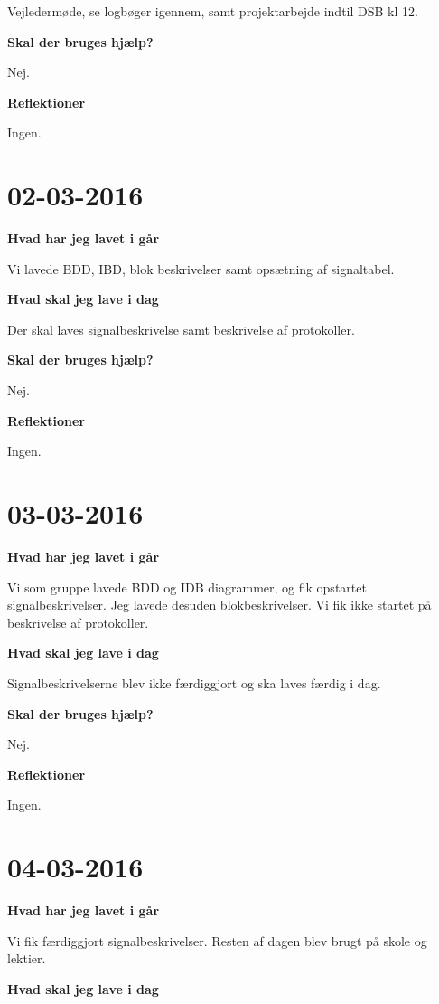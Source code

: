 \documentclass{article}
\begin{document}
	Vejledermøde, se logbøger igennem, samt projektarbejde indtil DSB kl 12.
	
	\textbf{Skal der bruges hjælp?}
	
	Nej.
	
	\textbf{Reflektioner}
	
	Ingen.
		
	\section{02-03-2016}
	
	\textbf{Hvad har jeg lavet i går}
	
	Vi lavede BDD, IBD, blok beskrivelser samt opsætning af signaltabel.
	
	\textbf{Hvad skal jeg lave i dag}
	
	Der skal laves signalbeskrivelse samt beskrivelse af protokoller.
	
	\textbf{Skal der bruges hjælp?}
	
	Nej.
	
	\textbf{Reflektioner}
	
	Ingen.
	
	\section{03-03-2016}
	
	\textbf{Hvad har jeg lavet i går}
	
	Vi som gruppe lavede BDD og IDB diagrammer, og fik opstartet signalbeskrivelser. Jeg lavede desuden blokbeskrivelser. Vi fik ikke startet på beskrivelse af protokoller.
	
	\textbf{Hvad skal jeg lave i dag}
	
	Signalbeskrivelserne blev ikke færdiggjort og ska laves færdig i dag.
	
	\textbf{Skal der bruges hjælp?}
	
	Nej.
	
	\textbf{Reflektioner}
	
	Ingen.

	\section{04-03-2016}
	
	\textbf{Hvad har jeg lavet i går}
	
	Vi fik færdiggjort signalbeskrivelser. Resten af dagen blev brugt på skole og lektier.
	
	\textbf{Hvad skal jeg lave i dag}
	
\end{document}
